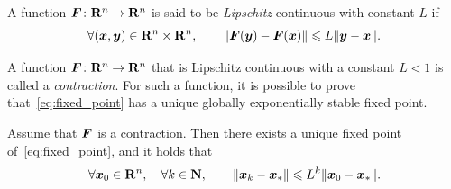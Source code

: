 \begin{definition}
    A function $\mathbf{\boldsymbol{F}}\colon \mathbf R^n \to \mathbf R^n$ is said to be \emph{Lipschitz} continuous
    with constant $L$ if
    \[
        \forall (\vect x, \vect y) \in \real^n \times \real^n, \qquad
        \norm[big]{\vect F(\vect y) - \vect F(\vect x)} \leq L \norm{\vect y - \vect x}.
    \]
\end{definition}
A function $\mathbf{\boldsymbol{F}}\colon \mathbf R^n \to \mathbf R^n$ that is Lipschitz continuous with a constant $L < 1$ is called a \emph{contraction}.
For such a function, it is possible to prove that~\eqref{eq:fixed_point} has a unique globally exponentially stable fixed point.
\begin{theorem}
    \label{theorem:exponenital_convergence_fixed_point}
    Assume that $\mathbf{\boldsymbol{F}}$ is a contraction.
    Then there exists a unique fixed point of~\eqref{eq:fixed_point},
    and it holds that
    \begin{equation}
        \label{eq:global_exp}
        \forall \mathbf{\boldsymbol{x}}_0 \in \mathbf R^n,
        \quad \forall k \in \mathbf N, \qquad
        \lVert\mathbf{\boldsymbol{x}}_k - \mathbf{\boldsymbol{x}}_*\rVert \leqslant L^k \lVert\mathbf{\boldsymbol{x}}_0 - \mathbf{\boldsymbol{x}}_*\rVert.
    \end{equation}
\end{theorem}
